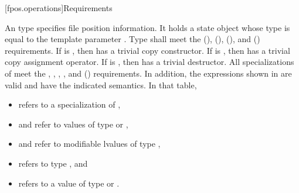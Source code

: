 [fpos.operations]{Requirements}

\pnum
{}%
%
An  type specifies file position information.
It holds a state object
whose type is equal to the template parameter .
Type  shall meet
the  (),
 (),
 (), and
 () requirements.
If  is ,
then  has a trivial copy constructor.
If  is ,
then  has a trivial copy assignment operator.
If  is ,
then  has a trivial destructor.
All specializations of  meet
the ,
,
,
,
and  () requirements.
In addition, the expressions shown in 
are valid and have the indicated semantics.
In that table,
\begin{itemize}
\item {} refers to a specialization of ,
\item {} and  refer to values
of type  or ,
\item {} and  refer to modifiable lvalues of type ,
\item {} refers to type , and
\item {} refers to a value
of type  or .
\end{itemize}

